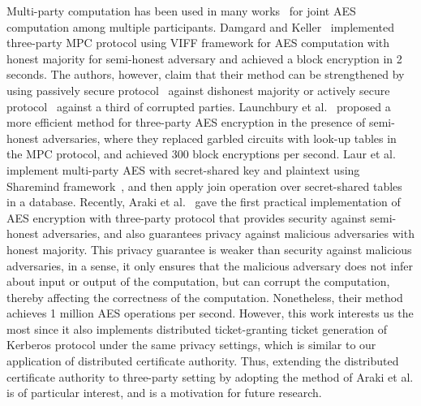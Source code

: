 Multi-party computation has been used in many works~\cite{damgaard2010secure, launchbury2012efficient, laur2013oblivious, araki2016high} for joint AES computation among multiple participants. Damgard and Keller~\cite{damgaard2010secure} implemented three-party MPC protocol using VIFF framework for AES computation with honest majority for semi-honest adversary and achieved a block encryption in 2 seconds. The authors, however, claim that their method can be strengthened by using passively secure protocol~\cite{ben1988completeness} against dishonest majority or actively secure protocol~\cite{damgaard2009asynchronous} against a third of corrupted parties. Launchbury et al.~\cite{launchbury2012efficient} proposed a more efficient method for three-party AES encryption in the presence of semi-honest adversaries, where they replaced garbled circuits with look-up tables in the MPC protocol, and achieved 300 block encryptions per second. Laur et al.~\cite{laur2013oblivious} implement multi-party AES with secret-shared key and plaintext using Sharemind framework~\cite{bogdanov2008sharemind}, and then apply join operation over secret-shared tables in a database. Recently, Araki et al.~\cite{araki2016high} gave the first practical implementation of AES encryption with three-party protocol that provides security against semi-honest adversaries, and also guarantees privacy against malicious adversaries with honest majority. This privacy guarantee is weaker than security against malicious adversaries, in a sense, it only ensures that the malicious adversary does not infer about input or output of the computation, but can corrupt the computation, thereby affecting the correctness of the computation. Nonetheless, their method achieves 1 million AES operations per second. However, this work interests us the most since it also implements distributed ticket-granting ticket generation of Kerberos protocol under the same privacy settings, which is similar to our application of distributed certificate authority. Thus, extending the distributed certificate authority to three-party setting by adopting the method of Araki et al. is of particular interest, and is a motivation for future research.





